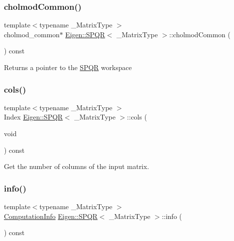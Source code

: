 \subsubsection{\texorpdfstring{cholmodCommon()}{cholmodCommon()}}
{\footnotesize\ttfamily template$<$typename \+\_\+\+Matrix\+Type $>$ \\
cholmod\+\_\+common$\ast$ \mbox{\hyperlink{class_eigen_1_1_s_p_q_r}{Eigen\+::\+S\+P\+QR}}$<$ \+\_\+\+Matrix\+Type $>$\+::cholmod\+Common (\begin{DoxyParamCaption}{ }\end{DoxyParamCaption}) const\hspace{0.3cm}{\ttfamily [inline]}}

\begin{DoxyReturn}{Returns}
a pointer to the \mbox{\hyperlink{class_eigen_1_1_s_p_q_r}{S\+P\+QR}} workspace 
\end{DoxyReturn}
\mbox{\label{class_eigen_1_1_s_p_q_r_aa006d40963b05c7525b5ca0b02364d84}} 
\subsubsection{\texorpdfstring{cols()}{cols()}}
{\footnotesize\ttfamily template$<$typename \+\_\+\+Matrix\+Type $>$ \\
Index \mbox{\hyperlink{class_eigen_1_1_s_p_q_r}{Eigen\+::\+S\+P\+QR}}$<$ \+\_\+\+Matrix\+Type $>$\+::cols (\begin{DoxyParamCaption}\item[{void}]{ }\end{DoxyParamCaption}) const\hspace{0.3cm}{\ttfamily [inline]}}

Get the number of columns of the input matrix. \mbox{\label{class_eigen_1_1_s_p_q_r_a3ab7bacba8d2be20adc10b4d5b6c071f}} 
\subsubsection{\texorpdfstring{info()}{info()}}
{\footnotesize\ttfamily template$<$typename \+\_\+\+Matrix\+Type $>$ \\
\mbox{\hyperlink{group__enums_ga85fad7b87587764e5cf6b513a9e0ee5e}{Computation\+Info}} \mbox{\hyperlink{class_eigen_1_1_s_p_q_r}{Eigen\+::\+S\+P\+QR}}$<$ \+\_\+\+Matrix\+Type $>$\+::info (\begin{DoxyParamCaption}{ }\end{DoxyParamCaption}) const\hspace{0.3cm}{\ttfamily [inline]}}




